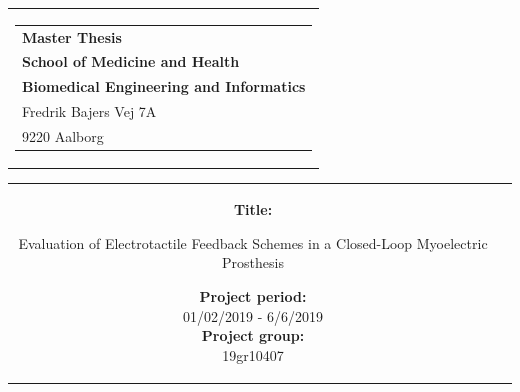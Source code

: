 % 
\thispagestyle{empty}
\begin{titlepage}
	\begin{nopagebreak}
		{\samepage 
			
			\begin{tabular}{r}
				\parbox{\textwidth}{  
					\hfill \hspace{2cm} \parbox{8cm}{\begin{tabular}{l} %
							{\small \textbf{\textcolor{aaublue}{Master Thesis}}}\\
							{\small \textbf{\textcolor{aaublue}{School of Medicine and Health}}}\\
							{\small \textbf{\textcolor{aaublue}{Biomedical Engineering and Informatics}}}\\
							{\small \textcolor{aaublue}{Fredrik Bajers Vej 7A}} \\
							{\small \textcolor{aaublue}{9220 Aalborg}} \\
				\end{tabular}}}
			\end{tabular}
			
			\begin{tabular}{cc}
				\parbox{7cm}{
					
					\textbf{Title:}
					
					Evaluation of Electrotactile Feedback Schemes in a
					Closed-Loop Myoelectric Prosthesis \\ 
					
%					
					
					
					\parbox{8cm}{
						
						
						\textbf{Project period:}\\
						01/02/2019 - 6/6/2019\\
						
						\textbf{Project group:}\\
						19gr10407\\ %
						
}}
\end{tabular}}
\end{nopagebreak}
\end{titlepage}
